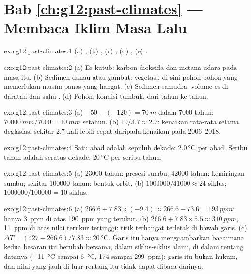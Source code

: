 \section*{Bab \ref{ch:g12:past-climates} --- Membaca Iklim Masa Lalu}

\begin{solution}{exo:g12:past-climates:1}
(a) ; (b) ; (c) ; (d) ;
(e) .
\end{solution}

\begin{solution}{exo:g12:past-climates:2}
(a) Es kutub: karbon dioksida dan metana udara pada masa itu. (b) Sedimen
danau atau gambut: vegetasi, di sini pohon-pohon yang memerlukan musim panas
yang hangat. (c) Sedimen samudra: volume es di daratan dan suhu .
(d) Pohon: kondisi tumbuh, dari tahun ke tahun.
\end{solution}

\begin{solution}{exo:g12:past-climates:3}
(a) $-50 - (-120) = \qty{70}{m}$ dalam \num{7000} tahun: $\qty{70000}{mm}/\num{7000}
= \qty{10}{mm}$ setahun. (b) $10/3.7 \approx 2.7$: kenaikan rata-rata selama
deglasiasi sekitar 2.7 kali lebih cepat daripada kenaikan pada 2006--2018.
\end{solution}

\begin{solution}{exo:g12:past-climates:4}
Satu abad adalah sepuluh dekade: $\qty{2.0}{\degreeCelsius}$ per abad. Seribu
tahun adalah seratus dekade: $\qty{20}{\degreeCelsius}$ per seribu tahun.
\end{solution}

\begin{solution}{exo:g12:past-climates:5}
(a) \num{23000} tahun: presesi sumbu; \num{42000} tahun: kemiringan sumbu;
sekitar \num{100000} tahun: bentuk orbit.
(b) $\num{1000000}/\num{41000} \approx 24$ siklus; $\num{1000000}/\num{100000}
= 10$ siklus.
\end{solution}

\begin{solution}{exo:g12:past-climates:6}
(a) $266.6 + 7.83 \times (-9.4) \approx 266.6 - 73.6 = \qty{193}{ppm}$: hanya
\qty{3}{ppm} di atas \qty{190}{ppm} yang terukur. (b) $266.6 + 7.83 \times 5.5
\approx \qty{310}{ppm}$, \qty{11}{ppm} di atas nilai terukur tertinggi: titik
terhangat terletak di bawah garis. (c) $\Delta T = (427 - 266.6)/7.83 \approx
\qty{20}{\degreeCelsius}$. Garis itu hanya menggambarkan bagaimana kedua besaran
itu berubah bersama, dalam siklus-siklus alami, di dalam rentang datanya
(\qty{-11}{\degreeCelsius} sampai \qty{+6}{\degreeCelsius}, 174 sampai
\qty{299}{ppm}); garis itu bukan hukum, dan nilai yang jauh di luar rentang itu
tidak dapat dibaca darinya.
\end{solution}

